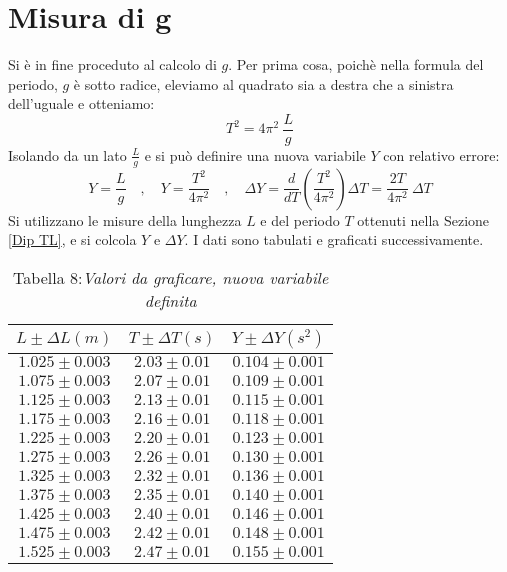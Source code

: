 \documentclass[12pt, a4paper]{article}
\begin{document}
\section{Misura di g}
Si è in fine proceduto al calcolo di $g$. Per prima cosa, poichè nella formula del periodo, $g$ è sotto radice, eleviamo al quadrato sia a destra che a sinistra dell'uguale e otteniamo:
\begin{equation*}
    T^2=4\pi^2\ \frac{L}{g}
\end{equation*} 
Isolando da un lato $\frac{L}{g}$ e si può definire una nuova variabile $Y$ con relativo errore:
\begin{equation*}
  Y=\frac{L}{g} \quad , \quad  Y=\frac{T^2}{4\pi^2} \quad , \quad \Delta Y=\frac{d}{dT}\left(\frac{T^2}{4\pi^2}\right)\Delta T=\frac{2T}{4\pi^2}\ \Delta T
\end{equation*}
Si utilizzano le misure della lunghezza $L$ e del periodo $T$ ottenuti nella Sezione \ref{Dip TL}, e si colcola $Y$ e $\Delta Y$. I dati sono tabulati e graficati successivamente.

 \begin{table}[!h]
    \centering
    \begin{tabular}{|c|c|c|}
    \hline
    $ L \pm \Delta L (m)$ & $ T \pm \Delta T (s) $  & $ Y \pm \Delta Y (s^2) $  \\ 
    \hline 
    $1.025 \pm 0.003$ & $2.03 \pm 0.01$ & $ 0.104 \pm 0.001$ \\ 
    $1.075 \pm 0.003$ & $2.07 \pm 0.01$ & $ 0.109 \pm 0.001$ \\ 
    $1.125 \pm 0.003$ & $2.13 \pm 0.01$ & $ 0.115 \pm 0.001$ \\ 
    $1.175 \pm 0.003$ & $2.16 \pm 0.01$ & $ 0.118 \pm 0.001$ \\ 
    $1.225 \pm 0.003$ & $2.20 \pm 0.01$ & $ 0.123 \pm 0.001$ \\ 
    $1.275 \pm 0.003$ & $2.26 \pm 0.01$ & $ 0.130 \pm 0.001$ \\ 
    $1.325 \pm 0.003$ & $2.32 \pm 0.01$ & $ 0.136 \pm 0.001$ \\ 
    $1.375 \pm 0.003$ & $2.35 \pm 0.01$ & $ 0.140 \pm 0.001$ \\ 
    $1.425 \pm 0.003$ & $2.40 \pm 0.01$ & $ 0.146 \pm 0.001$ \\
    $1.475 \pm 0.003$ & $2.42 \pm 0.01$ & $ 0.148 \pm 0.001$ \\
    $1.525 \pm 0.003$ & $2.47 \pm 0.01$ & $ 0.155 \pm 0.001$ \\
    \hline
    \end{tabular}
    \caption*{\centering Tabella 8:\small{\textit{Valori da graficare, nuova variabile definita}}}
    \label{tab:my_label}
\end{table}
 
\end{document}
